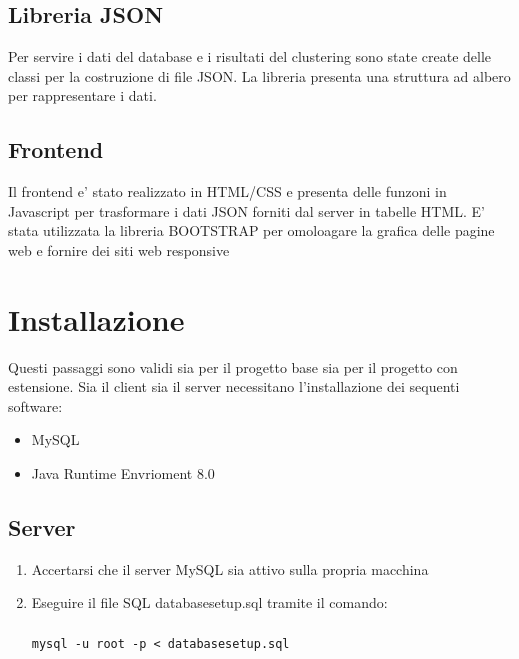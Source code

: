 \documentclass{article}
\begin{document}
        \subsection{Libreria JSON}
        Per servire i dati del database e i risultati del clustering sono state
        create delle classi per la costruzione di file JSON. La libreria
        presenta una struttura ad albero per rappresentare i dati.

        \subsection{Frontend}
        Il frontend e' stato realizzato in HTML/CSS e presenta delle funzoni 
        in Javascript per trasformare i dati JSON forniti dal server in tabelle
        HTML. E' stata utilizzata la libreria BOOTSTRAP per omoloagare la 
        grafica delle pagine web e fornire dei siti web responsive






    \newpage
    \section{Installazione}
    Questi passaggi sono validi sia per il progetto base sia per il progetto con
    estensione.
    Sia il client sia il server necessitano l'installazione dei sequenti
    software:
        \begin{itemize}
            \item MySQL
            \item Java Runtime Envrioment 8.0
        \end{itemize}

        \subsection{Server}
            \begin{enumerate}
                \item Accertarsi che il server MySQL sia attivo sulla propria
                macchina
                \item Eseguire il file SQL databasesetup.sql tramite il comando:
                    \\\\
                    \verb|mysql -u root -p < databasesetup.sql|
                
                
            \end{enumerate}
\end{document}
